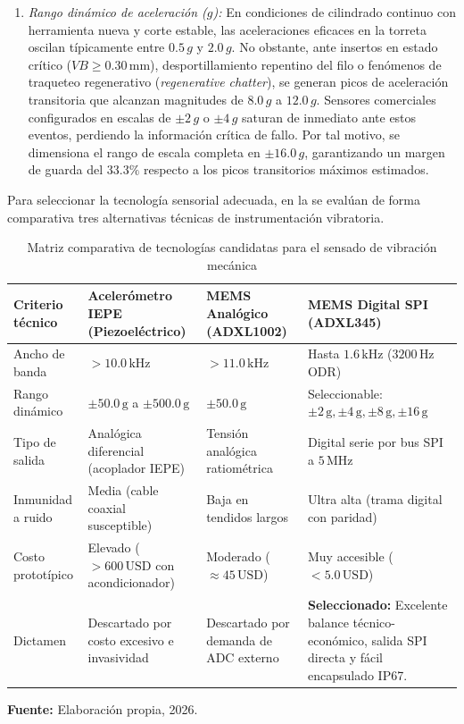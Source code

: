 \begin{enumerate}
    \item \textit{Rango dinámico de aceleración ($g$):} En condiciones de cilindrado continuo con herramienta nueva y corte estable, las aceleraciones eficaces en la torreta oscilan típicamente entre $0.5\,g$ y $2.0\,g$. No obstante, ante insertos en estado crítico ($VB \ge 0.30\,\text{mm}$), desportillamiento repentino del filo o fenómenos de traqueteo regenerativo (\textit{regenerative chatter}), se generan picos de aceleración transitoria que alcanzan magnitudes de $8.0\,g$ a $12.0\,g$. Sensores comerciales configurados en escalas de $\pm 2\,g$ o $\pm 4\,g$ saturan de inmediato ante estos eventos, perdiendo la información crítica de fallo. Por tal motivo, se dimensiona el rango de escala completa en $\pm 16.0\,g$, garantizando un margen de guarda del $33.3\%$ respecto a los picos transitorios máximos estimados.
\end{enumerate}

Para seleccionar la tecnología sensorial adecuada, en la  se evalúan de forma comparativa tres alternativas técnicas de instrumentación vibratoria.

{\setlength{\parskip}{1.5pt}
\begin{table}[H]
\centering
\caption{Matriz comparativa de tecnologías candidatas para el sensado de vibración mecánica}\label{tab:comparativa_acelerometros_mp}
\vspace{2mm}
\small
\begin{tabular}{p{2.6cm}p{3.0cm}p{3.0cm}p{4.8cm}}
\hline
\textbf{Criterio técnico} & \textbf{Acelerómetro IEPE (Piezoeléctrico)} & \textbf{MEMS Analógico (ADXL1002)} & \textbf{MEMS Digital SPI (ADXL345)} \\ \hline \hline
Ancho de banda & $> 10.0\,\text{kHz}$ & $> 11.0\,\text{kHz}$ & Hasta $1.6\,\text{kHz}$ ($3200\,\text{Hz}$ ODR) \\ \hline
Rango dinámico & $\pm 50.0\,\text{g}$ a $\pm 500.0\,\text{g}$ & $\pm 50.0\,\text{g}$ & Seleccionable: $\pm 2\,\text{g}, \pm 4\,\text{g}, \pm 8\,\text{g}, \pm 16\,\text{g}$ \\ \hline
Tipo de salida & Analógica diferencial (acoplador IEPE) & Tensión analógica ratiométrica & Digital serie por bus SPI a $5\,\text{MHz}$ \\ \hline
Inmunidad a ruido & Media (cable coaxial susceptible) & Baja en tendidos largos & Ultra alta (trama digital con paridad) \\ \hline
Costo prototípico & Elevado ($> 600\,\text{USD}$ con acondicionador) & Moderado ($\approx 45\,\text{USD}$) & Muy accesible ($< 5.0\,\text{USD}$) \\ \hline
Dictamen & Descartado por costo excesivo e invasividad & Descartado por demanda de ADC externo & \textbf{Seleccionado:} Excelente balance técnico-económico, salida SPI directa y fácil encapsulado IP67. \\ \hline
\end{tabular}
\par\vspace{2mm}
\footnotesize \textbf{Fuente:} Elaboración propia, 2026.
\end{table}
}

